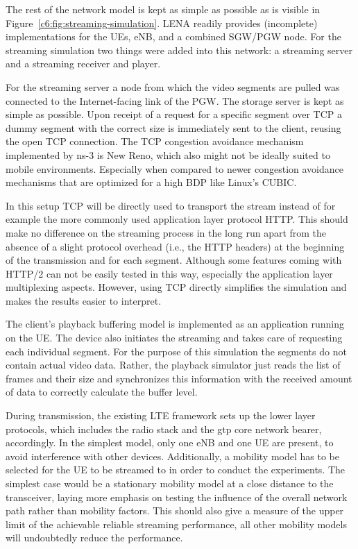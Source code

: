 The rest of the network model is kept as simple as possible as is visible in Figure~\ref{c6:fig:streaming-simulation}. LENA readily provides (incomplete) implementations for the \glspl{UE}, \gls{eNB}, and a combined \gls{SGW}/\gls{PGW} node. For the streaming simulation two things were added into this network: a streaming server and a streaming receiver and player.

For the streaming server a node from which the video segments are pulled was connected to the Internet-facing link of the \gls{PGW}. The storage server is kept as simple as possible. Upon receipt of a request for a specific segment over \gls{TCP} a dummy segment with the correct size is immediately sent to the client, reusing the open \gls{TCP} connection. %
The \gls{TCP} congestion avoidance mechanism implemented by ns-3 is New Reno, which also might not be ideally suited to mobile environments. Especially when compared to newer congestion avoidance mechanisms that are optimized for a high \gls{BDP} like Linux's CUBIC.

In this setup \gls{TCP} will be directly used to transport the stream instead of for example the more commonly used application layer protocol \gls{HTTP}. This should make no difference on the streaming process in the long run apart from the absence of a slight protocol overhead (i.e., the \gls{HTTP} headers) at the beginning of the transmission and for each segment. Although some features coming with \acrshort{HTTP}/2 can not be easily tested in this way, especially the application layer multiplexing aspects. However, using \gls{TCP} directly simplifies the simulation and makes the results easier to interpret.

The client's playback buffering model is implemented as an application running on the \gls{UE}. The device also initiates the streaming and takes care of requesting each individual segment. For the purpose of this simulation the segments do not contain actual video data. Rather, the playback simulator just reads the list of frames and their size and synchronizes this information with the received amount of data to correctly calculate the buffer level.

During transmission, the existing \gls{LTE} framework sets up the lower layer protocols, which includes the radio stack and the \gls{gtp} core network bearer, accordingly. In the simplest model, only one \gls{eNB} and one \gls{UE} are present, to avoid interference with other devices. Additionally, a mobility model has to be selected for the \gls{UE} to be streamed to in order to conduct the experiments. The simplest case would be a stationary mobility model at a close distance to the transceiver, laying more emphasis on testing the influence of the overall network path rather than mobility factors. This should also give a measure of the upper limit of the achievable reliable streaming performance, all other mobility models will undoubtedly reduce the performance.

